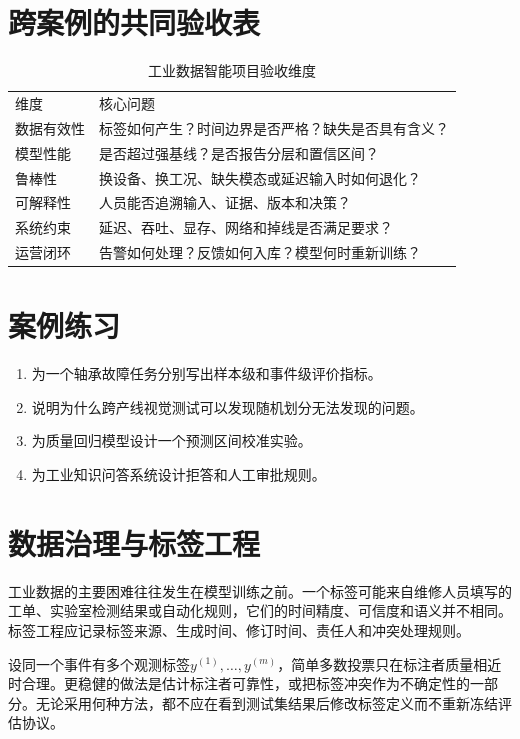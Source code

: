 \section{跨案例的共同验收表}
\begin{table}[htbp]
\centering
\caption{工业数据智能项目验收维度}
\begin{tabular}{p{}p{}}
\toprule
维度 & 核心问题\\
数据有效性 & 标签如何产生？时间边界是否严格？缺失是否具有含义？\\
模型性能 & 是否超过强基线？是否报告分层和置信区间？\\
鲁棒性 & 换设备、换工况、缺失模态或延迟输入时如何退化？\\
可解释性 & 人员能否追溯输入、证据、版本和决策？\\
系统约束 & 延迟、吞吐、显存、网络和掉线是否满足要求？\\
运营闭环 & 告警如何处理？反馈如何入库？模型何时重新训练？\\
\bottomrule
\end{tabular}
\end{table}

\section{案例练习}
\begin{enumerate}[label=\arabic*.]
 \item 为一个轴承故障任务分别写出样本级和事件级评价指标。
 \item 说明为什么跨产线视觉测试可以发现随机划分无法发现的问题。
 \item 为质量回归模型设计一个预测区间校准实验。
 \item 为工业知识问答系统设计拒答和人工审批规则。
\end{enumerate}

\section{数据治理与标签工程}
工业数据的主要困难往往发生在模型训练之前。一个标签可能来自维修人员填写的工单、实验室检测结果或自动化规则，它们的时间精度、可信度和语义并不相同。标签工程应记录标签来源、生成时间、修订时间、责任人和冲突处理规则。

设同一个事件有多个观测标签$y^{(1)},\ldots,y^{(m)}$，简单多数投票只在标注者质量相近时合理。更稳健的做法是估计标注者可靠性，或把标签冲突作为不确定性的一部分。无论采用何种方法，都不应在看到测试集结果后修改标签定义而不重新冻结评估协议。

